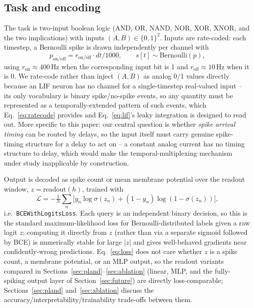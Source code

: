 \documentclass[conference]{IEEEtran}
\begin{document}
\subsection{Task and encoding}
The task is two-input boolean logic (AND, OR, NAND, NOR, XOR, XNOR, and the two
implications) with inputs $(A,B)\in\{0,1\}^2$. Inputs are rate-coded: each timestep, a
Bernoulli spike is drawn independently per channel with
\begin{equation}
p_{\text{on/off}} = r_{\text{on/off}}\cdot dt / 1000, \qquad s[t]\sim\mathrm{Bernoulli}(p),
\label{eq:ratecode}
\end{equation}
using $r_{\text{on}}\approx400\,\mathrm{Hz}$ when the corresponding input bit is 1 and
$r_{\text{off}}\approx10\,\mathrm{Hz}$ when it is 0. We rate-code rather than inject
$(A,B)$ as analog 0/1 values directly because an LIF neuron has no channel for a
single-timestep real-valued input -- its only vocabulary is binary spike/no-spike events,
so any quantity must be represented as a temporally-extended pattern of such events, which
Eq.~\eqref{eq:ratecode} provides and Eq.~\eqref{eq:lif}'s leaky integration is designed to
read out. More specific to this paper: our central question is whether \emph{spike
arrival timing} can be routed by delays, so the input itself must carry genuine
spike-timing structure for a delay to act on -- a constant analog current has no timing
structure to delay, which would make the temporal-multiplexing mechanism under study
inapplicable by construction.

Output is decoded as spike count or mean membrane potential over the readout window,
$z=\mathrm{readout}(h)$, trained with
\begin{equation}
\mathcal{L} = -\tfrac{1}{N}\textstyle\sum_n\big[y_n\log\sigma(z_n)
+ (1{-}y_n)\log(1-\sigma(z_n))\big],
\label{eq:loss}
\end{equation}
i.e.\ \texttt{BCEWithLogitsLoss}. Each query is an independent binary decision, so this is
the standard maximum-likelihood loss for Bernoulli-distributed labels given a raw logit
$z$; computing it directly from $z$ (rather than via a separate sigmoid followed by BCE)
is numerically stable for large $|z|$ and gives well-behaved gradients near
confidently-wrong predictions. Eq.~\eqref{eq:loss} does not care whether $z$ is a spike
count, a membrane potential, or an MLP output, so the readout variants compared in
Sections~\ref{sec:pland}--\ref{sec:ablation} (linear, MLP, and the fully-spiking output
layer of Section~\ref{sec:future}) are directly loss-comparable; Sections~\ref{sec:pland}
and~\ref{sec:ablation} discuss the accuracy/interpretability/trainability trade-offs
between them.
\end{document}
